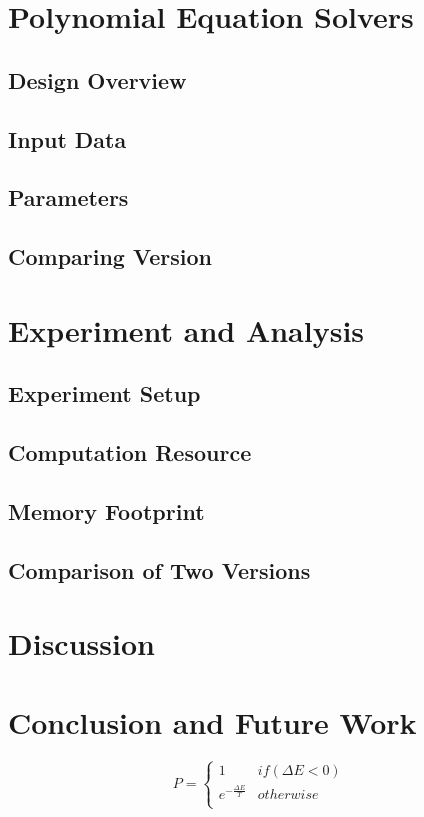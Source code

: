 \documentclass[twocolumn]{article}
\begin{document}
\section{Polynomial Equation Solvers}
\label{sec:solver}
\subsection{Design Overview}

\subsection{Input Data}

\subsection{Parameters}

\subsection{Comparing Version}

\section{Experiment and Analysis}
\label{sec:experiment}

\subsection{Experiment Setup}

\subsection{Computation Resource}

\subsection{Memory Footprint}

\subsection{Comparison of Two Versions}

\section{Discussion}
\label{sec:discussion}

\section{Conclusion and Future Work}
\label{sec:conclusion}
\begin{equation}
\label{SA_prob}
P=
\begin{cases}
1 & if(\Delta E < 0) \\
e^{-\frac{\Delta E}{T}}&otherwise \\
\end{cases}
\end{equation}
\end{document}
